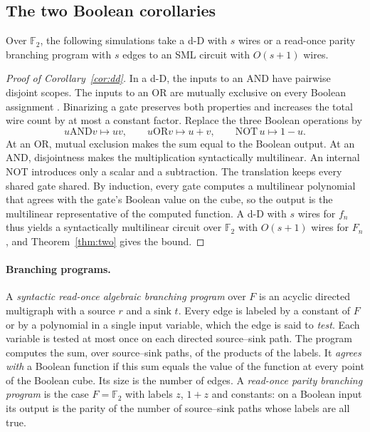 \documentclass[11pt]{article}
\theoremstyle{remark}
\newcommand{\F}{\mathbb F}
\begin{document}
\subsection{The two Boolean corollaries}\label{sec:sim}
Over \(\F_2\), the following simulations take a d-D with \(s\) wires or
a read-once parity branching program with \(s\) edges to an SML circuit
with \(O(s+1)\) wires.

\begin{proof}[Proof of Corollary~\ref{cor:dd}]
In a d-D, the inputs to an AND have pairwise disjoint scopes. The inputs to
an OR are mutually exclusive on every Boolean assignment \cite[Definition 3]{dd}.
Binarizing a gate preserves both properties and increases the total wire
count by at most a constant factor. Replace the three Boolean operations by
\[
 u\mathbin{\mathrm{AND}}v\longmapsto uv,\qquad
 u\mathbin{\mathrm{OR}}v\longmapsto u+v,\qquad
 \mathrm{NOT}\,u\longmapsto 1-u .
\]
At an OR, mutual exclusion makes the sum equal to the Boolean output. At an
AND, disjointness makes the multiplication syntactically multilinear.
An internal NOT introduces only a scalar and a subtraction. The translation
keeps every shared gate shared. By induction, every gate computes a
multilinear polynomial that agrees with the gate's Boolean value on the cube,
so the output is the multilinear representative of the computed function. A
d-D with \(s\) wires for \(f_n\) thus yields a syntactically multilinear
circuit over \(\F_2\) with \(O(s+1)\) wires for \(F_n\), and
Theorem~\ref{thm:two} gives the bound.
\end{proof}

\paragraph{Branching programs.}
A \emph{syntactic read-once algebraic branching program} over \(F\) is an
acyclic directed multigraph with a source \(r\) and a sink \(t\). Every
edge is labeled by a constant of \(F\) or by a polynomial in a single
input variable, which the edge is said to \emph{test}. Each variable is
tested at most once on each directed source--sink path. The program
computes the sum, over source--sink paths, of the products of the labels.
It \emph{agrees with} a Boolean function if this sum equals the value of
the function at every point of the Boolean cube. Its size is the number
of edges. A \emph{read-once parity branching program}
\cite[Definition 1.1]{volk} is the case \(F=\F_2\) with labels \(z\),
\(1+z\) and constants: on a Boolean input its output is the parity of the
number of source--sink paths whose labels are all true.
\end{document}
